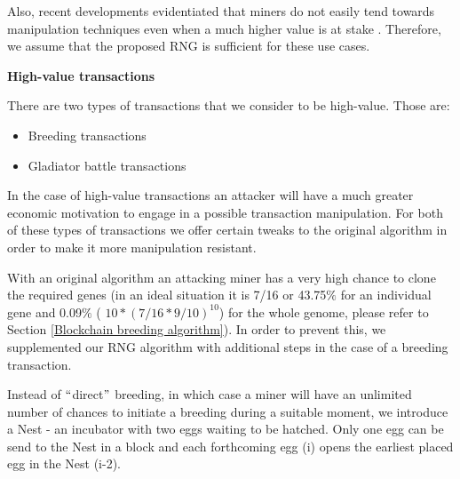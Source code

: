 \documentclass[12pt]{article}
\begin{document}
\begin{justify}
Also, recent developments evidentiated that miners do not easily tend towards manipulation techniques even when a much higher value is at stake  \cite{SECBIT_2018_Aug_22}. Therefore, we assume that the proposed RNG is sufficient for these use cases.
\end{justify}\par

\textbf{High-value transactions}\par

There are two types of transactions that we consider to be high-value. Those are:\par

\begin{itemize}
	\item Breeding transactions\par

	\item Gladiator battle transactions
\end{itemize}\par

\begin{justify}
In the case of high-value transactions an attacker will have a much greater economic motivation to engage in a possible transaction manipulation. For both of these types of transactions we offer certain tweaks to the original algorithm in order to make it more manipulation resistant.
\end{justify}\par

\begin{justify}
With an original algorithm an attacking miner has a very high chance to clone the required genes (in an ideal situation it is 7/16 or 43.75$\%$  for an individual gene and 0.09$\%$  ( $10*(7/16*9/10)^{10}$) for the whole genome, please refer to Section  \ref{Blockchain breeding algorithm}). In order to prevent this, we supplemented our RNG algorithm with additional steps in the case of a breeding transaction.
\end{justify}\par

\begin{justify}
Instead of $``$direct$"$ breeding, in which case a miner will have an unlimited number of chances to initiate a breeding during a suitable moment, we introduce a Nest - an incubator with two eggs waiting to be hatched. Only one egg can be send to the Nest in a block and each forthcoming egg (i) opens the earliest placed egg in the Nest (i-2).
\end{justify}\par
\end{document}
